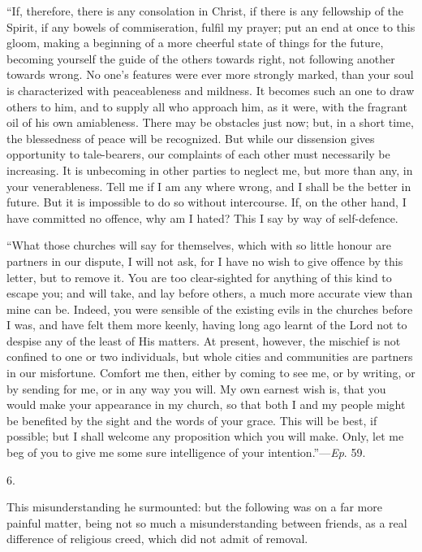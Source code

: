 ``If, therefore, there is any consolation in Christ, if there
is any fellowship of the Spirit, if any bowels of commiseration,
fulfil my prayer; put an end at once to this gloom, making a beginning
of a more cheerful state of things for the future, becoming yourself
the guide of the others towards right, not following another towards
wrong. No one's features were ever more strongly marked, than your
soul is characterized with peaceableness and mildness. It becomes such
an one to draw others to him, and to supply all who approach him, as
it were, with the fragrant oil of his own amiableness. There may be
obstacles just now; but, in a short time, the blessedness of peace
will be recognized. But while our dissension gives opportunity to
tale-bearers, our complaints of each other must necessarily be
increasing. It is unbecoming in other parties to neglect me, but more
than any, in your venerableness. Tell me if I am any where wrong, and
I shall be the better in future. But it is impossible to do so without
intercourse. If, on the other hand, I have committed no offence, why
am I hated? This I say by way of self-defence.

``What those churches will say for themselves, which with so
little honour are partners in our dispute, I will not ask, for I have
no wish to give offence by this letter, but to remove it. You are too
clear-sighted for anything of this kind to escape you; and will take,
and lay before others, a much more accurate view than mine can be.
Indeed, you were sensible of the existing evils in the churches before
I was, and have felt them more keenly, having long ago learnt of the
Lord not to despise any of the least of His matters. At present,
however, the mischief is not confined to one or two individuals, but
whole cities and communities are partners in our misfortune. Comfort
me then, either by coming to see me, or by writing, or by sending for
me, or in any way you will. My own earnest wish is, that you would
make your appearance in my church, so that both I and my people might
be benefited by the sight and the words of your grace. This will be
best, if possible; but I shall welcome any proposition which you will
make. Only, let me beg of you to give me some sure intelligence of
your intention.''—\emph{Ep}. 59.

6.

This misunderstanding he surmounted: but the following was on
a far more painful matter, being not so much a misunderstanding
between friends, as a real difference of religious creed, which did
not admit of removal.

